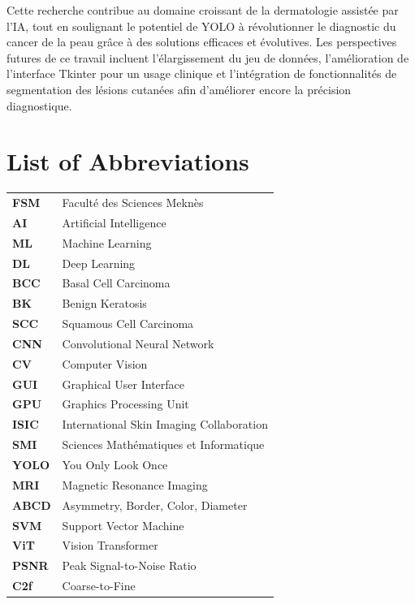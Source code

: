 \documentclass[a4paper,12pt]{report}
\begin{document}
\begin{spacing}{1.5}
    Cette recherche contribue au domaine croissant de la dermatologie assistée par l'IA, tout en soulignant le potentiel de YOLO à révolutionner le diagnostic du cancer de la peau grâce à des solutions efficaces et évolutives. Les perspectives futures de ce travail incluent l'élargissement du jeu de données, l'amélioration de l'interface Tkinter pour un usage clinique et l'intégration de fonctionnalités de segmentation des lésions cutanées afin d'améliorer encore la précision diagnostique.  

\tableofcontents
\listoffigures
\listoftables

\chapter*{List of Abbreviations}
\begin{tabular}{ll}
\textbf{FSM}     & Faculté des Sciences Meknès \\
\textbf{AI}      & Artificial Intelligence \\
\textbf{ML}      & Machine Learning \\
\textbf{DL}      & Deep Learning \\
\textbf{BCC}     & Basal Cell Carcinoma \\
\textbf{BK}      & Benign Keratosis \\
\textbf{SCC}     & Squamous Cell Carcinoma \\
\textbf{CNN}     & Convolutional Neural Network \\
\textbf{CV}      & Computer Vision \\
\textbf{GUI}     & Graphical User Interface \\
\textbf{GPU}     & Graphics Processing Unit \\
\textbf{ISIC}    & International Skin Imaging Collaboration \\
\textbf{SMI}     & Sciences Mathématiques et Informatique \\
\textbf{YOLO}    & You Only Look Once \\
\textbf{MRI}     & Magnetic Resonance Imaging \\
\textbf{ABCD}    & Asymmetry, Border, Color, Diameter \\
\textbf{SVM}     & Support Vector Machine \\
\textbf{ViT}     & Vision Transformer \\
\textbf{PSNR}    & Peak Signal-to-Noise Ratio \\
\textbf{C2f}     & Coarse-to-Fine \\

\end{tabular}
\end{spacing}
\end{document}
